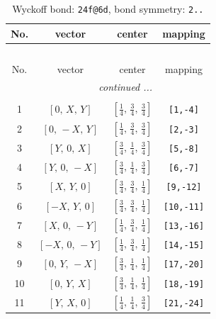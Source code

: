\documentclass[fleqn,8pt]{jsarticle}
\begin{document}
\begin{longtable}{cccc}
\caption{Wyckoff bond: {\tt 24f@6d}, bond symmetry: {\tt 2..}}
 \\
 \hline \hline
No. & vector & center & mapping \\ \hline \endfirsthead

\multicolumn{3}{l}{\tablename\ \thetable{}} \\
 \hline \hline
No. & vector & center & mapping \\ \hline \endhead

 \hline \hline
\multicolumn{3}{r}{\footnotesize\it continued ...} \\ \endfoot

 \hline \hline
\multicolumn{3}{r}{} \\ \endlastfoot

1 & $\left[ 0,\, X,\, Y \right]$ & $\left[ \frac{1}{4},\, \frac{3}{4},\, \frac{3}{4} \right]$ & {\tt [1,-4]} \\ \hline
2 & $\left[ 0,\, - X,\, Y \right]$ & $\left[ \frac{1}{4},\, \frac{3}{4},\, \frac{3}{4} \right]$ & {\tt [2,-3]} \\ \hline
3 & $\left[ Y,\, 0,\, X \right]$ & $\left[ \frac{3}{4},\, \frac{1}{4},\, \frac{3}{4} \right]$ & {\tt [5,-8]} \\ \hline
4 & $\left[ Y,\, 0,\, - X \right]$ & $\left[ \frac{3}{4},\, \frac{1}{4},\, \frac{3}{4} \right]$ & {\tt [6,-7]} \\ \hline
5 & $\left[ X,\, Y,\, 0 \right]$ & $\left[ \frac{3}{4},\, \frac{3}{4},\, \frac{1}{4} \right]$ & {\tt [9,-12]} \\ \hline
6 & $\left[ - X,\, Y,\, 0 \right]$ & $\left[ \frac{3}{4},\, \frac{3}{4},\, \frac{1}{4} \right]$ & {\tt [10,-11]} \\ \hline
7 & $\left[ X,\, 0,\, - Y \right]$ & $\left[ \frac{1}{4},\, \frac{3}{4},\, \frac{1}{4} \right]$ & {\tt [13,-16]} \\ \hline
8 & $\left[ - X,\, 0,\, - Y \right]$ & $\left[ \frac{1}{4},\, \frac{3}{4},\, \frac{1}{4} \right]$ & {\tt [14,-15]} \\ \hline
9 & $\left[ 0,\, Y,\, - X \right]$ & $\left[ \frac{3}{4},\, \frac{1}{4},\, \frac{1}{4} \right]$ & {\tt [17,-20]} \\ \hline
10 & $\left[ 0,\, Y,\, X \right]$ & $\left[ \frac{3}{4},\, \frac{1}{4},\, \frac{1}{4} \right]$ & {\tt [18,-19]} \\ \hline
11 & $\left[ Y,\, X,\, 0 \right]$ & $\left[ \frac{1}{4},\, \frac{1}{4},\, \frac{3}{4} \right]$ & {\tt [21,-24]} \\ \hline

\end{longtable}
\end{document}
